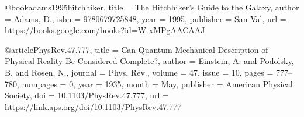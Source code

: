 @book{adams1995hitchhiker,
  title     = {{The Hitchhiker's Guide to the Galaxy}},
  author    = {Adams, D.},
  isbn      = {9780679725848},
  year      = {1995},
  publisher = {San Val},
  url       = {https://books.google.com/books?id=W-xMPgAACAAJ}
}

@article{PhysRev.47.777,
  title     = {Can Quantum-Mechanical Description of Physical Reality Be Considered Complete?},
  author    = {Einstein, A. and Podolsky, B. and Rosen, N.},
  journal   = {Phys. Rev.},
  volume    = {47},
  issue     = {10},
  pages     = {777--780},
  numpages  = {0},
  year      = {1935},
  month     = {May},
  publisher = {American Physical Society},
  doi       = {10.1103/PhysRev.47.777},
  url       = {https://link.aps.org/doi/10.1103/PhysRev.47.777}
}